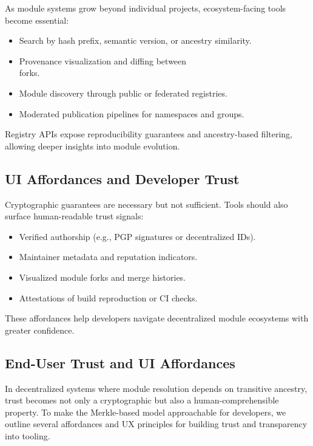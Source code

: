 \documentclass[sigplan,screen]{acmart}
\begin{document}
As module systems grow beyond individual projects, ecosystem-facing tools become essential:
\begin{itemize}
  \item Search by hash prefix, semantic version, or ancestry similarity.
  \item Provenance visualization and diffing between \\forks.
  \item Module discovery through public or federated registries.
  \item Moderated publication pipelines for namespaces and groups.
\end{itemize}

Registry APIs expose reproducibility guarantees and ancestry-based filtering, allowing deeper insights into module evolution.

\subsection{UI Affordances and Developer Trust}

Cryptographic guarantees are necessary but not sufficient. Tools should also surface human-readable trust signals:

\begin{itemize}
  \item Verified authorship (e.g., PGP signatures or decentralized IDs).
  \item Maintainer metadata and reputation indicators.
  \item Visualized module forks and merge histories.
  \item Attestations of build reproduction or CI checks.
\end{itemize}

These affordances help developers navigate decentralized module ecosystems with greater confidence.

\subsection{End-User Trust and UI Affordances}
\label{sec:trust-ui}

In decentralized systems where module resolution depends on transitive ancestry, trust becomes not only a cryptographic but also a human-comprehensible property. To make the Merkle-based model approachable for developers, we outline several affordances and UX principles for building trust and transparency into tooling.
\end{document}
